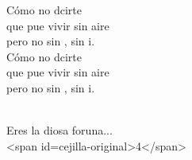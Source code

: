 \begin{cancion}
\begin{chorus}
	Cómo no dcirte\\
	que pue vivir sin aire\\
	pero no sin , sin i.\\
\jump
	Cómo no dcirte\\
	que pue vivir sin aire\\
	pero no sin , sin i.\\
	\end{chorus}%
	\jump\\
	Eres la diosa foruna...\\
<span id=cejilla-original>4</span>\\
\end{cancion}%
